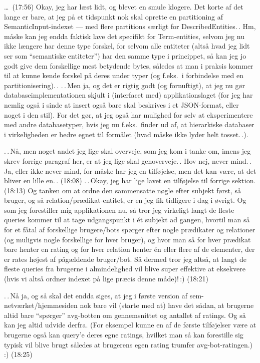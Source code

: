 \documentclass{report}
\begin{document}
\ldots\ (17:56) Okay, jeg har læst lidt, og blevet en smule klogere. Det korte af det lange er bare, at jeg på et tidspunkt nok skal oprette en partitioning af SemanticInput-indexet --- med flere partitions særligt for DescribedEntities.\,. Hm, måske kan jeg endda faktisk lave det specifikt for Term-entities, selvom jeg nu ikke længere har denne type forskel, for selvom alle entiteter (altså hvad jeg lidt ser som ``semantiske entiteter'') har den samme type i princippet, så kan jeg jo godt give dem forskellige mest betydende bytes, således at man i praksis kommer til at kunne kende forskel på deres under typer (og f.eks.\ i forbindelse med en partitionisering).\,. .\,.\,Men ja, og det er rigtig godt (og fornuftigt), at jeg nu gør databaseimplementationen skjult i (interfacet med) applikationslaget (for jeg har nemlig også i sinde at insert også bare skal beskrives i et JSON-format, eller noget i den stil). For det gør, at jeg også har mulighed for selv at eksperimentere med andre databasetyper, hvis jeg nu f.eks.\ finder ud af, at hierarkiske databaser i virkeligheden er bedre egnet til formålet (hvad måske ikke lyder helt tosset.\,.). 

.\,.\,Nå, men noget andet jeg lige skal overveje, som jeg kom i tanke om, imens jeg skrev forrige paragraf her, er at jeg lige skal genoverveje.\,. Hov nej, never mind.\,. Ja, eller ikke never mind, for måske har jeg en tilføjelse, men det kan være, at det bliver en lille en.\,. (18:08) .\,.\,Okay, jeg har lige lavet en tilføjelse til forrige sektion. (18:13) Og tanken om at ordne den sammensatte nøgle efter subjekt først, så bruger, og så relation/prædikat-entitet, er en jeg fik tidligere i dag i øvrigt. Og som jeg forestiller mig applikationen nu, så tror jeg virkeligt langt de fleste queries kommer til at tage udgangspunkt i ét subjekt ad gangen, hvortil man så for et fåtal af forskellige brugere/bots spørger efter nogle prædikater og relationer (og muligvis nogle forskellige for hver bruger), og hvor man så for hver prædikat bare henter en rating og for hver relation henter én eller flere af de elementer, der er rates højest af pågældende bruger/bot. Så dermed tror jeg altså, at langt de fleste queries fra brugerne i almindelighed vil blive super effektive at eksekvere (hvis vi altså ordner indexet på lige præcis denne måde)!\,:) (18:21)

.\,.\,Nå ja, og så skal det endda siges, at jeg i første version af sem-netværket/hjemmesiden nok bare vil (starte med at) have det sådan, at brugerne altid bare ``spørger'' avg-botten om gennemsnittet og antallet af ratings. Og så kan jeg altid udvide derfra. (For eksempel kunne en af de første tilføjelser være at brugerne også kan query'e deres egne ratings, hvilket man så kan forestille sig typisk vil blive brugt således at brugerens egen rating trumfer avg-bot-ratingen.) :) (18:25) 
\end{document}
